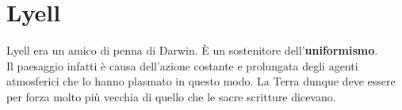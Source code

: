 
\section{Lyell}
Lyell era un amico di penna di Darwin. È un sostenitore dell'\textbf{uniformismo}.\\
Il paesaggio infatti è causa dell'azione costante e prolungata degli agenti atmosferici che lo hanno
plasmato in questo modo. La Terra dunque deve essere per forza molto più vecchia di quello che le 
sacre scritture dicevano.
